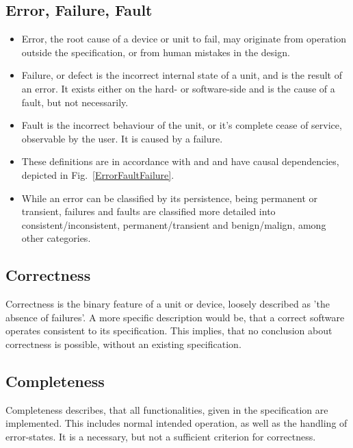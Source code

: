 	\subsection{Error, Failure, Fault}
	\begin{minipage}{\linewidth}
	\begin{itemize}
		\item {Error}, the root cause of a device or unit to fail, may originate from operation outside the specification, or from human mistakes in the design.
		\item {Failure}, or defect is the incorrect internal state of a unit, and is the result of an error. It exists either on the hard- or software-side and is the cause of a fault, but not necessarily.
		\item {Fault} is the incorrect behaviour of the unit, or it's complete cease of service, observable by the user. It is caused by a failure.
		\item These definitions are in accordance with \cite{Liggesmeyer2002} and \cite{Kopetz1997} and have causal dependencies, depicted in Fig.~\ref{ErrorFaultFailure}.
		\item While an error can be classified by its persistence, being permanent or transient, failures and faults are classified more detailed into consistent/inconsistent, permanent/transient and benign/malign, among other categories.
	\end{itemize}
	\end{minipage}
	
	\subsection{Correctness}
		{Correctness} is the binary feature of a unit or device, loosely described as 'the absence of failures'. A more specific description would be, that a correct software operates consistent to its specification. This implies, that no conclusion about correctness is possible, without an existing specification.
	\subsection{Completeness}
		{Completeness} describes, that all functionalities, given in the specification are implemented. This includes normal intended operation, as well as the handling of error-states. It is a necessary, but not a sufficient criterion for correctness.
